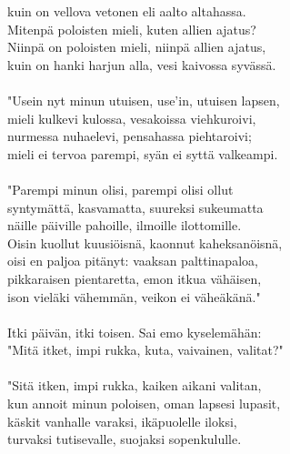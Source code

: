 kuin on vellova vetonen eli aalto altahassa.                   \\
Mitenpä poloisten mieli, kuten allien ajatus?                  \\
Niinpä on poloisten mieli, niinpä allien ajatus,               \\
kuin on hanki harjun alla, vesi kaivossa syvässä.              \\
                                                               \\
"Usein nyt minun utuisen, use'in, utuisen lapsen,              \\
mieli kulkevi kulossa, vesakoissa viehkuroivi,                 \\
nurmessa nuhaelevi, pensahassa piehtaroivi;                    \\
mieli ei tervoa parempi, syän ei syttä valkeampi.              \\
                                                               \\
"Parempi minun olisi, parempi olisi ollut                      \\
syntymättä, kasvamatta, suureksi sukeumatta                    \\
näille päiville pahoille, ilmoille ilottomille.                \\
Oisin kuollut kuusiöisnä, kaonnut kaheksanöisnä,               \\
oisi en paljoa pitänyt: vaaksan palttinapaloa,                 \\
pikkaraisen pientaretta, emon itkua vähäisen,                  \\
ison vieläki vähemmän, veikon ei väheäkänä."                   \\
                                                               \\
Itki päivän, itki toisen. Sai emo kyselemähän:                 \\
"Mitä itket, impi rukka, kuta, vaivainen, valitat?"            \\
                                                               \\
"Sitä itken, impi rukka, kaiken aikani valitan,                \\
kun annoit minun poloisen, oman lapsesi lupasit,               \\
käskit vanhalle varaksi, ikäpuolelle iloksi,                   \\
turvaksi tutisevalle, suojaksi sopenkululle.                   \\
